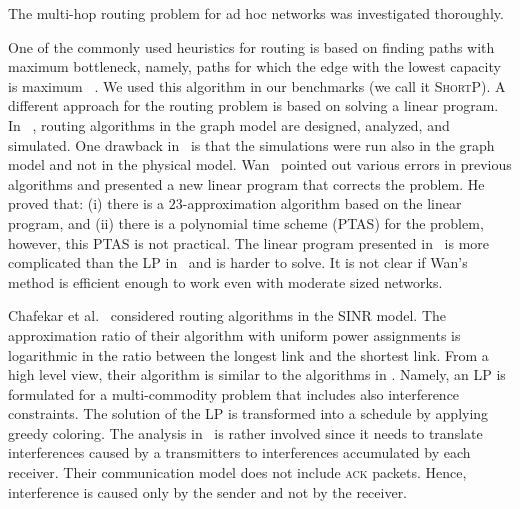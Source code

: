 \documentclass[12pt]{article}
\newenvironment{proof sketch}[1]{\noindent {\emph{Proof sketch of #1:}}}{\hfill \qed}
\newcommand{\algB}{\textsc{ShortP}}
\newcommand{\algS}{\algB}
\begin{document}
The multi-hop routing problem for ad hoc networks was investigated
thoroughly.

One of the commonly used heuristics for routing is based on finding
paths with maximum bottleneck, namely, paths for which the edge with
the lowest capacity is maximum ~\cite{draves2004routing}.  We used
this algorithm in our benchmarks (we call it \algS). A different
approach for the routing problem is based on solving a linear program.
In ~\cite{kumar2005algorithmic,jain2005impact,alicherry2005joint11},
routing algorithms in the graph model are designed, analyzed, and
simulated.  One drawback
in~\cite{kumar2005algorithmic,jain2005impact,alicherry2005joint11} is
that the simulations were run also in the graph model and not in the
physical model.  Wan~\cite{wan2009multiflows} pointed out various
errors in previous algorithms and presented a new linear program that
corrects the problem. He proved that: (i) there is a
$23$-approximation algorithm based on the linear program, and (ii)
there is a polynomial time scheme (PTAS) for the problem, however,
this PTAS is not practical.  The linear program presented
in~\cite{wan2009multiflows} is more complicated than the LP
in~\cite{kumar2005algorithmic,alicherry2005joint11,buragohain2007improved}
and is harder to solve. It is not clear if Wan's method is efficient
enough to work even with moderate sized networks.

Chafekar et al.~\cite{ChafekarCapacity,chafekarPhD} considered routing
algorithms in the SINR model. The approximation ratio of their
algorithm with uniform power assignments is logarithmic in the ratio
between the longest link and the shortest link. From a high level
view, their algorithm is similar to the algorithms in
\cite{kumar2005algorithmic,alicherry2005joint11,buragohain2007improved}.
Namely, an LP is formulated for a multi-commodity problem that
includes also interference constraints. The solution of the LP is
transformed into a schedule by applying greedy coloring. The analysis
in~\cite{ChafekarCapacity} is rather involved since it needs to
translate interferences caused by a transmitters to interferences
accumulated by each receiver.
Their communication model does not include \textsc{ack} packets.
Hence, interference is caused only by the sender and not by the
receiver.
\end{document}

